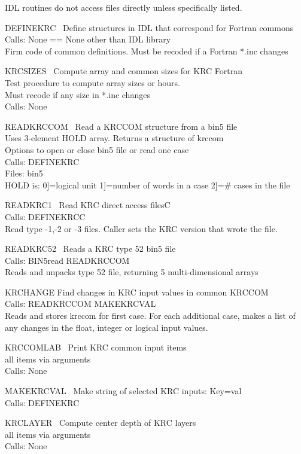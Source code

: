 \documentclass{article}
\begin{document}
IDL routines do not access files directly unless specifically listed.

DEFINEKRC \ Define structures in IDL that correspond for Fortran commons \\
Calls: None == None other than IDL library \\
Firm code of common definitions. Must be recoded if a Fortran *.inc changes

KRCSIZES \ Compute array and common sizes for KRC Fortran \\
Test procedure to compute array sizes or hours. \\
Must recode if any size in *.inc changes \\
Calls: None

READKRCCOM \ Read a KRCCOM structure from a bin5 file \\
Uses 3-element HOLD array. Returns a structure of krccom \\
Options to open or close bin5 file or read one case  \\
Calls: DEFINEKRC \\
Files: bin5 \\
HOLD is: 0]=logical unit  1]=number of words in a case  2]=\# cases in the file 

READKRC1 \ Read KRC direct access filesC \\
Calls:  DEFINEKRCC \\
Read type -1,-2 or -3 files. Caller sets the KRC version that wrote the file. 

READKRC52 \ Reads a KRC type 52 bin5 file \\
Calls:  BIN5read  READKRCCOM \\
Reads and unpacks type 52 file, returning 5 multi-dimensional arrays

KRCHANGE   Find changes in KRC input values in common KRCCOM \\
Calls:  READKRCCOM  MAKEKRCVAL \\
Reads and stores krccom for first case. For each additional case, makes a 
list of any changes in the float, integer or logical input values. 

KRCCOMLAB \ Print KRC common input items \\
 all items via arguments \\
Calls: None

MAKEKRCVAL \ Make string of selected KRC inputs: Key=val \\
Calls: DEFINEKRC

KRCLAYER \ Compute center depth of KRC layers \\
 all items via arguments \\
Calls: None
\end{document}
